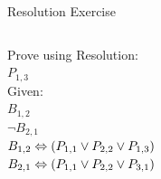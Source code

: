 \documentclass[14pt]{beamer}
\begin{document}
\begin{frame}[label=resolution-exercise]{Resolution Exercise}
\begin{columns}[T]
\begin{column}{0.45\textwidth}
Prove using Resolution:\\[.2em]
$P_{1, 3}$\\
\bigskip
Given: \\[.2em]
$B_{1, 2}$ \\
$\lnot B_{2, 1}$ \\
$B_{1, 2} \Leftrightarrow (P_{1, 1} \lor P_{2, 2} \lor P_{1, 3})$ \\
$B_{2, 1} \Leftrightarrow (P_{1, 1} \lor P_{2, 2} \lor P_{3, 1})$
\end{column}
\begin{column}{0.45\textwidth}
\begin{wumpusgrid}{3}{0.2\textheight}
\end{wumpusgrid}
\end{column}
\end{columns}
\end{frame}
\end{document}
